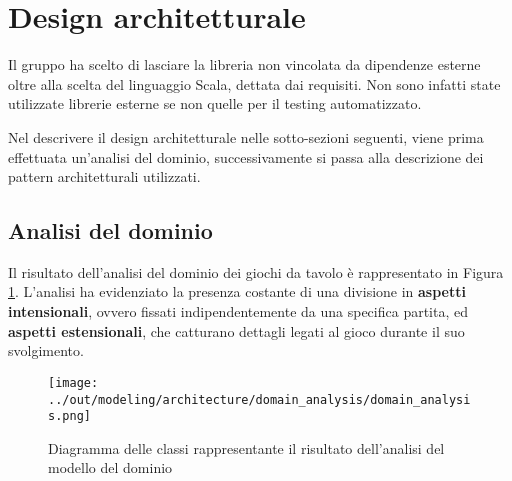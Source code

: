\section{Design architetturale}




Il gruppo ha scelto di lasciare la libreria non vincolata da dipendenze esterne oltre alla scelta del linguaggio Scala, dettata dai requisiti.
%
Non sono infatti state utilizzate librerie esterne se non quelle per il testing automatizzato.

Nel descrivere il design architetturale nelle sotto-sezioni seguenti, viene prima effettuata un'analisi del dominio, successivamente si passa alla descrizione dei pattern architetturali utilizzati.

\subsection{Analisi del dominio}

Il risultato dell'analisi del dominio dei giochi da tavolo è rappresentato in Figura \ref{fig:domain_analysis}.
%
L'analisi ha evidenziato la presenza costante di una divisione in \textbf{aspetti intensionali}, ovvero fissati indipendentemente da una specifica partita, ed \textbf{aspetti estensionali}, che catturano dettagli legati al gioco durante il suo svolgimento.

\begin{figure}
    \centering
    \texttt{[image: ../out/modeling/architecture/domain\_analysis/domain\_analysis.png]}
    \caption{Diagramma delle classi rappresentante il risultato dell'analisi del modello del dominio}
    \label{fig:domain_analysis}
\end{figure}

